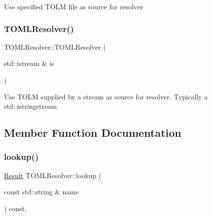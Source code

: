 Use specified T\+O\+LM file as source for resolver \mbox{\label{classtheoria_1_1config_1_1TOMLResolver_a2772b7d149cabddd2b622b786720420f}} 
\subsubsection{\texorpdfstring{T\+O\+M\+L\+Resolver()}{TOMLResolver()}\hspace{0.1cm}{\footnotesize\ttfamily [2/2]}}
{\footnotesize\ttfamily T\+O\+M\+L\+Resolver\+::\+T\+O\+M\+L\+Resolver (\begin{DoxyParamCaption}\item[{std\+::istream \&}]{is }\end{DoxyParamCaption})\hspace{0.3cm}{\ttfamily [explicit]}}

Use T\+O\+LM supplied by a stream as source for resolver. Typically a std\+::istringstream 

\subsection{Member Function Documentation}
\mbox{\label{classtheoria_1_1config_1_1TOMLResolver_a42daff166eca2c9c9dd77868faf0122d}} 
\subsubsection{\texorpdfstring{lookup()}{lookup()}}
{\footnotesize\ttfamily \hyperlink{classtheoria_1_1config_1_1ConfigVariableResolver_af27a85262d802c9ad4ecb1179efaf447}{Result} T\+O\+M\+L\+Resolver\+::lookup (\begin{DoxyParamCaption}\item[{const std\+::string \&}]{name }\end{DoxyParamCaption}) const\hspace{0.3cm}{\ttfamily [override]}, {\ttfamily [virtual]}}

